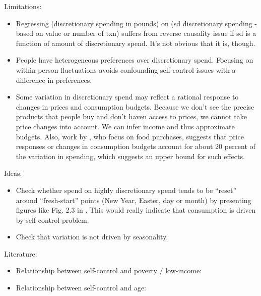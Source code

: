 Limitations:
\begin{itemize}
    \item Regressing (discretionary spending in pounds) on (sd discretionary spending -
        based on value or number of txn) suffers from reverse causality issue
        if sd is a function of amount of discretionary spend. It's not obvious
        that it is, though.

    \item People have heterogeneous preferences over discretionary spend.
        Focusing on within-person fluctuations avoids confounding self-control
        issues with a difference in preferences.

    \item Some variation in discretionary spend may reflect a rational response
        to changes in prices and consumption budgets. Because we don't see the
        precise products that people buy and don't haven access to prices, we
        cannot take price changes into account. We can infer income and thus
        approximate budgets. Also, work by \citet{cherchye2017new}, who focus on food
        purchases, suggests that price responses or changes in consumption
        budgets account for about 20 percent of the variation in spending,
        which suggests an upper bound for such effects.

\end{itemize}


Ideas:
\begin{itemize}

    \item Check whether spend on highly discretionary spend tends to be
        ``reset'' around ``fresh-start'' points (New Year, Easter, day or
        month) by presenting figures like Fig. 2.3 in \citet{cherchye2017new}.
        This would really indicate that consumption is driven by self-control
        problem.

    \item Check that variation is not driven by seasonality.

\end{itemize}


Literature:
\begin{itemize}
    \item Relationship between self-control and poverty / low-income:
        \citet{mani2013poverty, haushofer2014psychology, bernheim2015poverty}

    \item Relationship between self-control and age:
        \citet{ameriks2007measuring, bucciol2012measuring}
\end{itemize}
